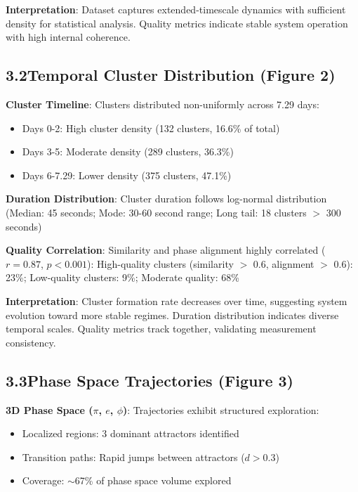 \documentclass[11pt]{article}
\begin{document}
\noindent\textbf{Interpretation}: Dataset captures extended-timescale dynamics with sufficient density for statistical analysis. Quality metrics indicate stable system operation with high internal coherence.

\subsection*{3.2\quad Temporal Cluster Distribution (Figure 2)}

\noindent\textbf{Cluster Timeline}: Clusters distributed non-uniformly across 7.29 days:
\begin{itemize}
    \item Days 0-2: High cluster density (132 clusters, 16.6\% of total)
    \item Days 3-5: Moderate density (289 clusters, 36.3\%)
    \item Days 6-7.29: Lower density (375 clusters, 47.1\%)
\end{itemize}

\noindent\textbf{Duration Distribution}: Cluster duration follows log-normal distribution (Median: 45 seconds; Mode: 30-60 second range; Long tail: 18 clusters $>$ 300 seconds)

\noindent\textbf{Quality Correlation}: Similarity and phase alignment highly correlated ($r = 0.87$, $p < 0.001$): High-quality clusters (similarity $>$ 0.6, alignment $>$ 0.6): 23\%; Low-quality clusters: 9\%; Moderate quality: 68\%

\noindent\textbf{Interpretation}: Cluster formation rate decreases over time, suggesting system evolution toward more stable regimes. Duration distribution indicates diverse temporal scales. Quality metrics track together, validating measurement consistency.

\subsection*{3.3\quad Phase Space Trajectories (Figure 3)}

\noindent\textbf{3D Phase Space ($\pi$, $e$, $\phi$)}: Trajectories exhibit structured exploration:
\begin{itemize}
    \item Localized regions: 3 dominant attractors identified
    \item Transition paths: Rapid jumps between attractors ($d > 0.3$)
    \item Coverage: $\sim$67\% of phase space volume explored
\end{itemize}
\end{document}

